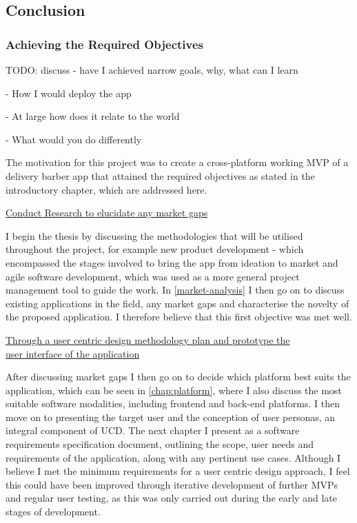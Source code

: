 \documentclass[12pt]{article}
\begin{document}
	\subsection{Conclusion}
	
	\subsubsection{Achieving the Required Objectives}
	
	TODO:
	discuss 
	- have I achieved narrow goals, why, what can I learn
	
	- How I would deploy the app
	
	- At large how does it relate to the world
	
	- What would you do differently
	
	
	
	The motivation for this project was to create a cross-platform working MVP of a delivery barber app that attained the required objectives as stated in the introductory chapter, which are addressed here.
	\newline
	
	\noindent
	\underline{Conduct Research to elucidate any market gaps}
	\newline
	
	\noindent
	I begin the thesis by discussing the methodologies that will be utilised throughout the project, for example new product development - which encompassed the stages involved to bring the app from ideation to market and agile software development, which was used as a more general project management tool to guide the work. In \autoref{market-analysis} I then go on to discuss existing applications in the field, any market gaps and characterise the novelty of the proposed application. I therefore believe that this first objective was met well.
	\newline
	
	\noindent
	\underline{Through a user centric design methodology plan and prototype the}
	\\
	\underline{user interface of the application} 
	\newline
	
	\noindent
	After discussing market gaps I then go on to decide which platform best suits the application, which can be seen in \autoref{chap:platform}, where I also discuss the most suitable software modalities, including frontend and back-end platforms. I then move on to presenting the target user and the conception of user personas, an integral component of UCD. The next chapter I present as a software requirements specification document, outlining the scope, user needs and requirements of the application, along with any pertinent use cases. Although I believe I met the minimum requirements for a user centric design approach, I feel this could have been improved through iterative development of further MVPs and regular user testing, as this was only carried out during the early and late stages of development.
	\newline
	
\end{document}
